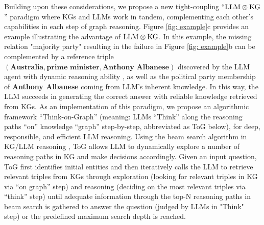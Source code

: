 \documentclass{article} %
\begin{document}
Building upon these considerations, we propose a new tight-coupling ``$\hbox{LLM} \otimes \hbox{KG}$'' paradigm where KGs and LLMs work in tandem, complementing each other's capabilities in each step of graph reasoning.
Figure \ref{fig: example}c provides an example illustrating the advantage of $\hbox{LLM} \otimes \hbox{KG}$. In this example, the missing relation "majority party" resulting in the failure in Figure \ref{fig: example}b can be complemented by a reference triple $(\textbf{Australia},\textbf{prime minister},\textbf{Anthony Albanese})$ discovered by the LLM agent with dynamic reasoning ability \citep{yao2022react}, as well as the political party membership of \textbf{Anthony Albanese} coming from LLM's inherent knowledge.
In this way, the LLM succeeds in generating the correct answer with reliable knowledge retrieved from KGs.
As an implementation of this paradigm, we propose an algorithmic framework ``Think-on-Graph'' (meaning: LLMs ``Think'' along the reasoning paths ``on'' knowledge ``graph'' step-by-step, abbreviated as ToG below),
for deep, responsible, and efficient LLM reasoning.
Using the beam search algorithm \citep{beamsearch} in KG/LLM reasoning \citep{kg_beam, beamsearchqa, self_eval, liu2024what}, ToG allows LLM to dynamically explore a number of reasoning paths in KG and make decisions accordingly.
Given an input question, ToG first identifies initial entities and then iteratively calls the LLM to retrieve relevant triples from KGs through exploration (looking for relevant triples in KG via ``on graph'' step) and reasoning (deciding on the most relevant triples via ``think'' step) until adequate information through the top-N reasoning paths in beam search is gathered to answer the question (judged by LLMs in "Think" step) or the predefined maximum search depth is reached.


\end{document}
